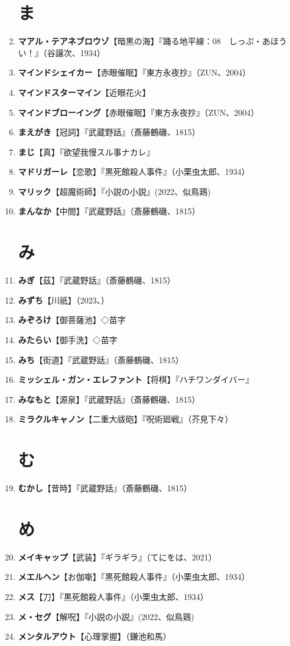 \documentclass[twocolumn]{jsbook}
\begin{document}
\begin{enumerate}
\section*{ま}
    \item \textbf{マアル・テアネブロウゾ}【暗黒の海】『踊る地平線：08　しっぷ・あほうい！』（谷譲次、1934）
    \item \textbf{マインドシェイカー}【赤眼催眠】『東方永夜抄』（ZUN、2004）
    \item \textbf{マインドスターマイン}【近眼花火】
    \item \textbf{マインドブローイング}【赤眼催眠】『東方永夜抄』（ZUN、2004）
    \item \textbf{まえがき}【冠詞】『武蔵野話』（斎藤鶴磯、1815）
    \item \textbf{まじ}【真】『欲望我慢スル事ナカレ』
    \item \textbf{マドリガーレ}【恋歌】『黒死館殺人事件』（小栗虫太郎、1934）
    \item \textbf{マリック}【超魔術師】『小説の小説』(2022、似鳥鶏)
    \item \textbf{まんなか}【中間】『武蔵野話』（斎藤鶴磯、1815）
\section*{み}
    \item \textbf{みぎ}【茲】『武蔵野話』（斎藤鶴磯、1815）
    \item \textbf{みずち}【川祇】（2023、）
    \item \textbf{みぞろけ}【御菩薩池】◇苗字
    \item \textbf{みたらい}【御手洗】◇苗字
    \item \textbf{みち}【街道】『武蔵野話』（斎藤鶴磯、1815）
    \item \textbf{ミッシェル・ガン・エレファント}【将棋】『ハチワンダイバー』
    \item \textbf{みなもと}【源泉】『武蔵野話』（斎藤鶴磯、1815）
    \item \textbf{ミラクルキャノン}【二重大祓砲】『呪術廻戦』（芥見下々）
\section*{む}
    \item \textbf{むかし}【昔時】『武蔵野話』（斎藤鶴磯、1815）
\section*{め}
    \item \textbf{メイキャップ}【武装】『ギラギラ』（てにをは、2021）
    \item \textbf{メエルヘン}【お伽噺】『黒死館殺人事件』（小栗虫太郎、1934）
    \item \textbf{メス}【刀】『黒死館殺人事件』（小栗虫太郎、1934）
    \item \textbf{メ・セグ}【解呪】『小説の小説』(2022、似鳥鶏)
    \item \textbf{メンタルアウト}【心理掌握】（鎌池和馬）

\end{enumerate}
\end{document}
